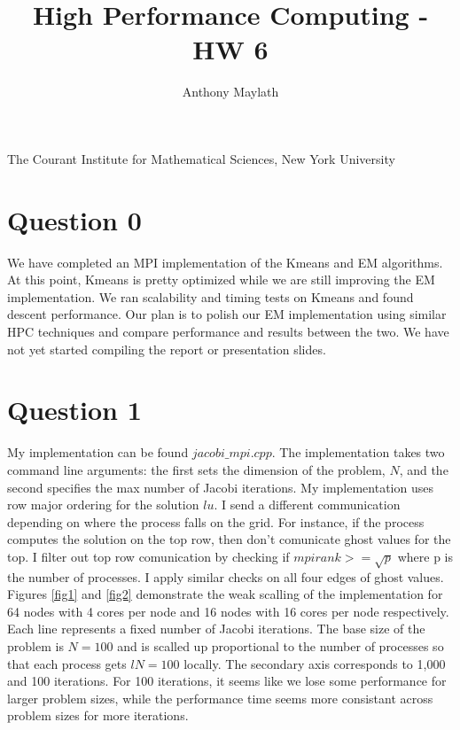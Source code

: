 \documentclass[10pt]{article}
\title{High Performance Computing - HW 6}
\author{Anthony Maylath}
\begin{document}
\maketitle

\begin{center}

The Courant Institute for Mathematical Sciences, New York University \\ 

\end{center}

\setcounter{MaxMatrixCols}{13}

\section{Question 0}

We have completed an MPI implementation of the Kmeans and EM algorithms. At this point, Kmeans is pretty optimized while we are still improving the EM implementation. We ran scalability and timing tests on Kmeans and found descent performance. Our plan is to polish our EM  implementation using similar HPC techniques and compare performance and results between the two. We have not yet started compiling the report or presentation slides.

\section{Question 1}

My implementation can be found $jacobi\_mpi.cpp$. The implementation takes two command line arguments: the first sets the dimension of the problem, $N$, and the second specifies the max number of Jacobi iterations. My implementation uses row major ordering for the solution $lu$. I send a different communication depending on where the process falls on the grid. For instance, if the process computes the solution on the top row, then don't comunicate ghost values for the top. I filter out top row comunication by checking if $mpirank >= \sqrt{p}$ where p is the number of processes. I apply similar checks on all four edges of ghost values.\\

Figures \ref{fig1} and \ref{fig2} demonstrate the weak scalling of the implementation for 64 nodes with 4 cores per node and 16 nodes with 16 cores per node respectively. Each line represents a fixed number of Jacobi iterations. The base size of the problem is $N=100$ and is scalled up proportional to the number of processes so that each process gets $lN = 100$ locally. The secondary axis corresponds to 1,000 and 100 iterations. For 100 iterations, it seems like we lose some performance for larger problem sizes, while the performance time seems more consistant across problem sizes for more iterations. 
\end{document}

